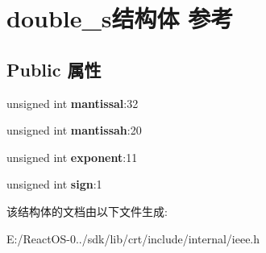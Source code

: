\hypertarget{structdouble__s}{}\section{double\+\_\+s结构体 参考}
\label{structdouble__s}
\subsection*{Public 属性}
\begin{DoxyCompactItemize}
\item 
\mbox{\label{structdouble__s_ae97e5c14996b827f4298907ae37e6cb4}} 
unsigned int {\bfseries mantissal}\+:32
\item 
\mbox{\label{structdouble__s_a3c69d44fd94efe914bb0f34e0f77fa36}} 
unsigned int {\bfseries mantissah}\+:20
\item 
\mbox{\label{structdouble__s_a3ca4bbf81ed3ebe3b19f8fee5891c2ad}} 
unsigned int {\bfseries exponent}\+:11
\item 
\mbox{\label{structdouble__s_af8b5b18f7e5af6b1c71bdb51219f4a94}} 
unsigned int {\bfseries sign}\+:1
\end{DoxyCompactItemize}


该结构体的文档由以下文件生成\+:\begin{DoxyCompactItemize}
\item 
E\+:/\+React\+O\+S-\/0../sdk/lib/crt/include/internal/ieee.\+h\end{DoxyCompactItemize}
